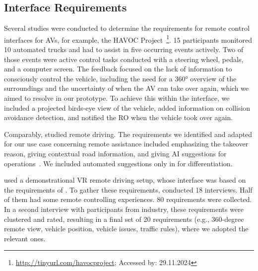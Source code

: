 \subsection{Interface Requirements}
\label{ssec:interfacereq}
Several studies were conducted to determine the requirements for remote control interfaces for AVs, for example, the HAVOC Project~\cite{havoc}\footnote{\url{http://tinyurl.com/havocproject}; Accessed by: 29.11.2024}. 15 participants monitored 10 automated trucks and had to assist in five occurring events actively. Two of those events were active control tasks conducted with a steering wheel, pedals, and a computer screen. %
The feedback focused on the lack of information to consciously control the vehicle, including the need for a 360° overview of the surroundings and the uncertainty of when the AV can take over again, which we aimed to resolve in our prototype. To achieve this within the interface, we included a projected birds-eye view of the vehicle, added information on collision avoidance detection, and notified the RO when the vehicle took over again.

Comparably, \citet{tener_driving_2022} studied remote driving.  %
The requirements we identified and adapted for our use case concerning remote assistance included emphasizing the takeover reason, giving contextual road information, and giving AI suggestions for operations~\cite{tener_driving_2022}. We included automated suggestions only in \pathPlanning for differentiation. %

\citet{gafert_teleoperationstation_2022} used a demonstrational VR remote driving setup, whose interface was based on the requirements of \citet{graf_user_2020}.
To gather these requirements, \citet{graf_user_2020} conducted 18 interviews. Half of them had some remote controlling experiences. %
80 requirements were collected. In a second interview with participants from industry, these requirements were clustered and rated, resulting in a final set of 20 requirements (e.g., 360-degree remote view, vehicle position, vehicle issues, traffic rules), where we adopted the relevant ones. %

